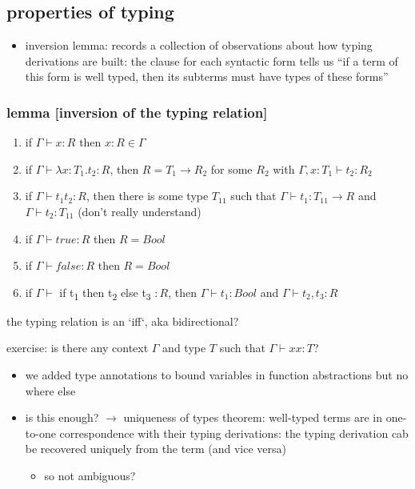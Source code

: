 \documentclass[11pt]{article}
\begin{document}
\subsection{properties of typing}
\label{sec:org5f4cf55}
\begin{itemize}
\item inversion lemma: records a collection of observations about how typing derivations are built: the clause for each syntactic form tells us ``if a term of this form is well typed, then its subterms must have types of these forms''
\end{itemize}

\subsubsection{lemma [inversion of the typing relation]}
\label{sec:orgeee3e86}
\begin{enumerate}
\item if \(\Gamma \vdash x : R\) then \(x:R \in \Gamma\)
\item if \(\Gamma \vdash \lambda x : T_1 . t_2 : R\), then \(R = T_1 \rightarrow R_2\) for some \(R_2\) with \(\Gamma, x: T_1 \vdash t_2 : R_2\)
\item if \(\Gamma \vdash t_1 t_2 : R\), then there is some type \(T_{11}\) such that \(\Gamma \vdash t_1 : T_{11} \rightarrow R\) and \(\Gamma \vdash t_2 : T_{11}\) (don't really understand)
\item if \(\Gamma \vdash true : R\) then \(R = Bool\)
\item if \(\Gamma \vdash false : R\) then \(R = Bool\)
\item if
\(\Gamma \vdash\) if t\textsubscript{1} then t\textsubscript{2} else t\textsubscript{3} \(: R\), then \(\Gamma \vdash t_1 : Bool\) and \(\Gamma \vdash t_2, t_3 : R\)
\end{enumerate}

the typing relation is an `iff`, aka bidirectional?

exercise: is there any context \(\Gamma\) and type \(T\) such that \(\Gamma \vdash x x :T\)?

\begin{itemize}
\item we added type annotations to bound variables in function abstractions but no where else
\item is this enough? \(\rightarrow\) uniqueness of types theorem: well-typed terms are in one-to-one correspondence with their typing derivations: the typing derivation cab be recovered uniquely from the term (and vice versa)
\begin{itemize}
\item so not ambiguous?
\end{itemize}
\end{itemize}
\end{document}
